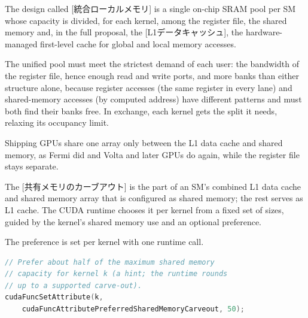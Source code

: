 \documentclass[../main.tex]{subfiles}
\begin{document}
\begin{definition}
  \label{def:l06-unified-local-memory}
  The design called [統合ローカルメモリ] is a
  single on-chip
  SRAM pool per SM whose capacity is divided, for each kernel, among the
  register file, the shared memory and, in the full proposal, the
  [L1データキャッシュ], the hardware-managed
  first-level cache for global and local memory accesses.
\end{definition}

The unified pool must meet the strictest demand of each user: the
bandwidth of the register file, hence enough read and write ports, and
more banks than either structure alone, because register accesses (the
same register in every lane) and shared-memory accesses (by computed
address) have different patterns and must both find their banks free.
In exchange, each kernel gets the split it needs, relaxing its
occupancy limit.

%
Shipping GPUs share one array only between the L1 data cache and
shared memory, as Fermi did and Volta and later GPUs do again, while
the register file stays separate.

\begin{definition}
  \label{def:l06-carveout}
  The [共有メモリのカーブアウト] is the
  part of an SM's combined L1 data cache and shared memory array that
  is configured as shared memory; the rest serves as L1 cache.  The
  CUDA runtime chooses it per kernel from a fixed set of sizes, guided
  by the kernel's shared memory use and an optional preference.
\end{definition}
%
The preference is set per kernel with one runtime call.

\begin{lstlisting}[language=C++, numbers=none]
// Prefer about half of the maximum shared memory
// capacity for kernel k (a hint; the runtime rounds
// up to a supported carve-out).
cudaFuncSetAttribute(k,
    cudaFuncAttributePreferredSharedMemoryCarveout, 50);
\end{lstlisting}
\end{document}
